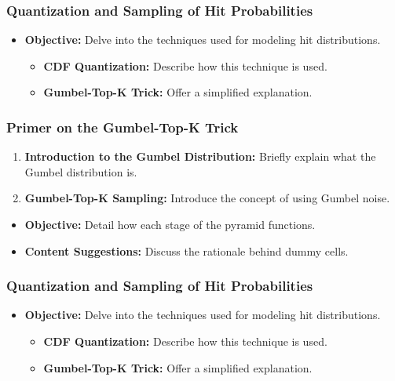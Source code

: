 \begin{frame}[t]
\frametitle{Quantization and Sampling of Hit Probabilities}

\begin{itemize}
\item \textbf{Objective:} Delve into the techniques used for modeling hit distributions.
\begin{itemize}
\item \textbf{CDF Quantization:} Describe how this technique is used.
\item \textbf{Gumbel-Top-K Trick:} Offer a simplified explanation.
\end{itemize}
\end{itemize}

\end{frame}

\begin{frame}[t]
\frametitle{Primer on the Gumbel-Top-K Trick}

\end{frame}

\begin{frame}[t]
\begin{enumerate}
\item \textbf{Introduction to the Gumbel Distribution:} Briefly explain what the Gumbel distribution is.
\item \textbf{Gumbel-Top-K Sampling:} Introduce the concept of using Gumbel noise.
\end{enumerate}
\end{frame}

\begin{frame}[t]
\begin{itemize}
\item \textbf{Objective:} Detail how each stage of the pyramid functions.
\item \textbf{Content Suggestions:} Discuss the rationale behind dummy cells.
\end{itemize}

\end{frame}

\begin{frame}[t]
\frametitle{Quantization and Sampling of Hit Probabilities}

\begin{itemize}
\item \textbf{Objective:} Delve into the techniques used for modeling hit distributions.
\begin{itemize}
\item \textbf{CDF Quantization:} Describe how this technique is used.
\item \textbf{Gumbel-Top-K Trick:} Offer a simplified explanation.
\end{itemize}
\end{itemize}

\end{frame}

